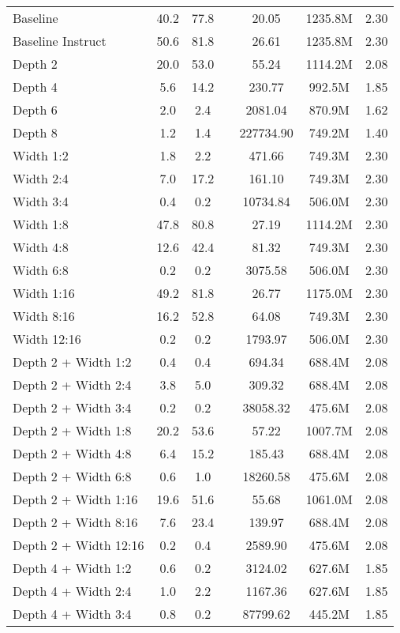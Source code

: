 {\begin{longtable}{lcccccc}
Baseline & 40.2 & 77.8 & & 20.05 & 1235.8M & 2.30 \\
Baseline Instruct & 50.6 & 81.8 & & 26.61 & 1235.8M & 2.30 \\
Depth 2 & 20.0 & 53.0 & & 55.24 & 1114.2M & 2.08 \\
Depth 4 & 5.6 & 14.2 & & 230.77 & 992.5M & 1.85 \\
Depth 6 & 2.0 & 2.4 & & 2081.04 & 870.9M & 1.62 \\
Depth 8 & 1.2 & 1.4 & & 227734.90 & 749.2M & 1.40 \\
Width 1:2 & 1.8 & 2.2 & & 471.66 & 749.3M & 2.30 \\
Width 2:4 & 7.0 & 17.2 & & 161.10 & 749.3M & 2.30 \\
Width 3:4 & 0.4 & 0.2 & & 10734.84 & 506.0M & 2.30 \\
Width 1:8 & 47.8 & 80.8 & & 27.19 & 1114.2M & 2.30 \\
Width 4:8 & 12.6 & 42.4 & & 81.32 & 749.3M & 2.30 \\
Width 6:8 & 0.2 & 0.2 & & 3075.58 & 506.0M & 2.30 \\
Width 1:16 & 49.2 & 81.8 & & 26.77 & 1175.0M & 2.30 \\
Width 8:16 & 16.2 & 52.8 & & 64.08 & 749.3M & 2.30 \\
Width 12:16 & 0.2 & 0.2 & & 1793.97 & 506.0M & 2.30 \\
Depth 2 + Width 1:2 & 0.4 & 0.4 & & 694.34 & 688.4M & 2.08 \\
Depth 2 + Width 2:4 & 3.8 & 5.0 & & 309.32 & 688.4M & 2.08 \\
Depth 2 + Width 3:4 & 0.2 & 0.2 & & 38058.32 & 475.6M & 2.08 \\
Depth 2 + Width 1:8 & 20.2 & 53.6 & & 57.22 & 1007.7M & 2.08 \\
Depth 2 + Width 4:8 & 6.4 & 15.2 & & 185.43 & 688.4M & 2.08 \\
Depth 2 + Width 6:8 & 0.6 & 1.0 & & 18260.58 & 475.6M & 2.08 \\
Depth 2 + Width 1:16 & 19.6 & 51.6 & & 55.68 & 1061.0M & 2.08 \\
Depth 2 + Width 8:16 & 7.6 & 23.4 & & 139.97 & 688.4M & 2.08 \\
Depth 2 + Width 12:16 & 0.2 & 0.4 & & 2589.90 & 475.6M & 2.08 \\
Depth 4 + Width 1:2 & 0.6 & 0.2 & & 3124.02 & 627.6M & 1.85 \\
Depth 4 + Width 2:4 & 1.0 & 2.2 & & 1167.36 & 627.6M & 1.85 \\
Depth 4 + Width 3:4 & 0.8 & 0.2 & & 87799.62 & 445.2M & 1.85 \\

\end{longtable}}

